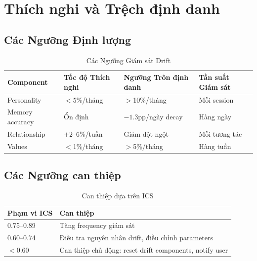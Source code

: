\section{Thích nghi và Trệch định danh}

\subsection{Các Ngưỡng Định lượng}

\begin{table}[H]
\centering
\caption{Các Ngưỡng Giám sát Drift}
\label{tab:drift-thresholds}
\begin{tabular}{llll}
\toprule
\textbf{Component} & \textbf{Tốc độ Thích nghi} & \textbf{Ngưỡng Trôn định danh} & \textbf{Tần suất Giám sát} \\
\midrule
Personality & $<$5\%/tháng & $>$10\%/tháng & Mỗi session \\
Memory accuracy & Ổn định & $-1.3$pp/ngày decay & Hàng ngày \\
Relationship & $+2$--$6$\%/tuần & Giảm đột ngột & Mỗi tương tác \\
Values & $<$1\%/tháng & $>$5\%/tháng & Hàng tuần \\
\bottomrule
\end{tabular}
\end{table}

\subsection{Các Ngưỡng can thiệp}

\begin{table}[H]
\centering
\caption{Can thiệp dựa trên ICS}
\label{tab:ics-intervention}
\begin{tabular}{ll}
\toprule
\textbf{Phạm vi ICS} & \textbf{Can thiệp} \\
\midrule
0.75--0.89 & Tăng frequency giám sát \\
0.60--0.74 & Điều tra nguyên nhân drift, điều chỉnh parameters \\
$<$0.60 & Can thiệp chủ động: reset drift components, notify user \\
\bottomrule
\end{tabular}
\end{table}

